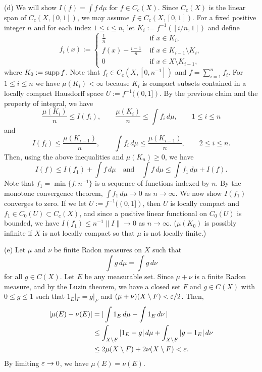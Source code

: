 \documentclass{../../large}
\begin{document}
\begin{pf}
(d)
We will show $I(f)=\int f\,d\mu$ for $f\in C_c(X)$.
Since $C_c(X)$ is the linear span of $C_c(X,[0,1])$, we may assume $f\in C_c(X,[0,1])$.
For a fixed positive integer $n$ and for each index $1\le i\le n$, let $K_i:=f^{-1}([i/n,1])$ and define
\[f_i(x):=\begin{cases}\frac1n&\text{ if }x\in K_i,\\f(x)-\frac{i-1}n&\text{ if }x\in K_{i-1}\setminus K_i,\\0&\text{ if }x\in X\setminus K_{i-1},\end{cases}\]
where $K_0:=\operatorname{supp} f$.
Note that $f_i\in C_c(X,[0,n^{-1}])$ and $f=\sum_{i=1}^nf_i$.
For $1\le i\le n$ we have $\mu(K_i)<\infty$ because $K_i$ is compact subsets contained in a locally compact Hausdorff space $U:=f^{-1}((0,1])$.
By the previous claim and the property of integral, we have
\[\frac{\mu(K_i)}n\le I(f_i),\qquad\frac{\mu(K_i)}n\le\int f_i\,d\mu,\qquad1\le i\le n\]
and
\[I(f_i)\le\frac{\mu(K_{i-1})}n,\qquad\int f_i\,d\mu\le\frac{\mu(K_{i-1})}n,\qquad2\le i\le n.\]
Then, using the above inequalities and $\mu(K_n)\ge0$, we have
\[I(f)\le I(f_1)+\int f\,d\mu\quad\text{and}\quad\int f\,d\mu\le\int f_1\,d\mu+I(f).\]
Note that $f_1=\min\{f,n^{-1}\}$ is a sequence of functions indexed by $n$.
By the monotone convergence theorem, $\int f_1\,d\mu\to0$ as $n\to\infty$.
We now show $I(f_1)$ converges to zero.
If we let $U:=f^{-1}((0,1])$, then $U$ is locally compact and $f_1\in C_0(U)\subset C_c(X)$, and since a positive linear functional on $C_0(U)$ is bounded, we have $I(f_1)\le n^{-1}\|I\|\to0$ as $n\to\infty$.
($\mu(K_0)$ is possibly infinite if $X$ is not locally compact so that $\mu$ is not locally finite.)

(e)
Let $\mu$ and $\nu$ be finite Radon measures on $X$ such that
\[\int g\,d\mu=\int g\,d\nu\]
for all $g\in C(X)$.
Let $E$ be any measurable set.
Since $\mu+\nu$ is a finite Radon measure, and by the Luzin theorem, we have a closed set $F$ and $g\in C(X)$ with $0\le g\le1$ such that $1_E|_F=g|_F$ and $(\mu+\nu)(X\setminus F)<\varepsilon/2$.
Then,
\begin{align*}
|\mu(E)-\nu(E)|&=|\int1_E\,d\mu-\int1_E\,d\nu\,|\\
&\le\int_{X\setminus F}|1_E-g|\,d\mu+\int_{X\setminus F}|g-1_E|\,d\nu\\
&\le2\mu(X\setminus F)+2\nu(X\setminus F)<\varepsilon.
\end{align*}
By limiting $\varepsilon\to0$, we have $\mu(E)=\nu(E)$.
\end{pf}
\end{document}
